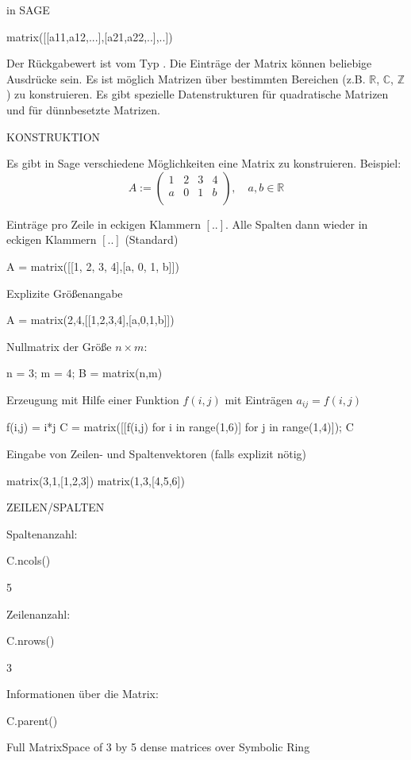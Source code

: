 \documentclass[fontsize=12pt,paper=a4,twoside,bibtotoc,idxtotoc,
liststotoc,pagesize,BCOR1.2cm,DIV15,chapterprefix,pagesize=pdftex]{scrbook}
\theoremstyle{plain}
\theoremstyle{definition}
\theoremstyle{remark}
\begin{document}
in SAGE

\begin{sagein}
matrix([[a11,a12,...],[a21,a22,..],..])
\end{sagein}


 Der Rückgabewert ist vom Typ .
 Die Einträge der Matrix können beliebige Ausdrücke sein.
 Es ist möglich Matrizen über bestimmten Bereichen
(z.B. $\mathbb{R}$, $\mathbb{C}$, $\mathbb{Z}$) zu
konstruieren.                                                     
 Es gibt spezielle Datenstrukturen für quadratische Matrizen und für dünnbesetzte Matrizen. 


KONSTRUKTION

Es gibt in Sage verschiedene Möglichkeiten eine Matrix zu
konstruieren. Beispiel:
\[ A:= \left( \begin{array}{cccc}
1 & 2 & 3 & 4\\
a & 0 & 1 & b\\ 
\end{array} \right), \quad a,b\in \mathbb{R} \]

 Einträge pro Zeile in eckigen Klammern $[ ..]$. Alle
Spalten dann wieder in eckigen Klammern $[ ..]$ (Standard)
\begin{sagein}
A = matrix([[1, 2, 3, 4],[a, 0, 1, b]]) 
\end{sagein}
 Explizite Größenangabe
\begin{sagein}
A = matrix(2,4,[[1,2,3,4],[a,0,1,b]]) 
\end{sagein}
 Nullmatrix der Größe $n \times m$:
\begin{sagein}
n = 3; m = 4; B = matrix(n,m)
\end{sagein}
 Erzeugung mit Hilfe einer Funktion $f(i,j)$ mit Einträgen $a_{ij}=f(i,j)$
\begin{sagein}
f(i,j) = i*j
C = matrix([[f(i,j) for i in range(1,6)] for j in range(1,4)]); C
\end{sagein}
 Eingabe von Zeilen- und Spaltenvektoren (falls explizit nötig)
\begin{sagein}
matrix(3,1,[1,2,3])
matrix(1,3,[4,5,6])
\end{sagein}


ZEILEN/SPALTEN


 Spaltenanzahl: 
\begin{sagein}
C.ncols()
\end{sagein}
\begin{sage}
  5
\end{sage}
 Zeilenanzahl: 
\begin{sagein}
C.nrows()
\end{sagein}
\begin{sage}
  3
\end{sage}
 Informationen über die Matrix: 
\begin{sagein}
C.parent()
\end{sagein}
\begin{sage}
Full MatrixSpace of 3 by 5 dense matrices over Symbolic Ring
\end{sage}
\end{document}
